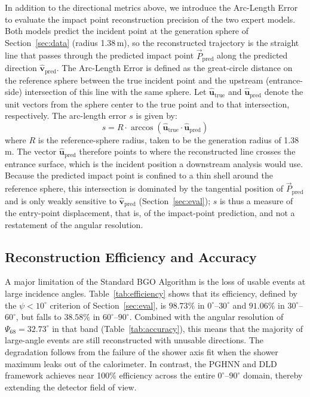 \documentclass[preprint,12pt]{elsarticle}
\begin{document}
In addition to the directional metrics above, we introduce the Arc-Length Error to evaluate the impact point reconstruction precision of the two expert models. Both models predict the incident point at the generation sphere of Section~\ref{sec:data} (radius 1.38\,m), so the reconstructed trajectory is the straight line that passes through the predicted impact point $\vec{P}_{\text{pred}}$ along the predicted direction $\hat{\mathbf{v}}_{\text{pred}}$. The Arc-Length Error is defined as the great-circle distance on the reference sphere between the true incident point and the upstream (entrance-side) intersection of this line with the same sphere. Let $\hat{\mathbf{u}}_{\text{true}}$ and $\hat{\mathbf{u}}_{\text{pred}}$ denote the unit vectors from the sphere center to the true point and to that intersection, respectively. The arc-length error $s$ is given by:
\begin{equation}
s = R \cdot \arccos(\hat{\mathbf{u}}_{\text{true}} \cdot \hat{\mathbf{u}}_{\text{pred}})
\end{equation}
where $R$ is the reference-sphere radius, taken to be the generation radius of 1.38\,m. The vector $\hat{\mathbf{u}}_{\text{pred}}$ therefore points to where the reconstructed line crosses the entrance surface, which is the incident position a downstream analysis would use. Because the predicted impact point is confined to a thin shell around the reference sphere, this intersection is dominated by the tangential position of $\vec{P}_{\text{pred}}$ and is only weakly sensitive to $\hat{\mathbf{v}}_{\text{pred}}$ (Section~\ref{sec:eval}); $s$ is thus a measure of the entry-point displacement, that is, of the impact-point prediction, and not a restatement of the angular resolution.

\subsection{Reconstruction Efficiency and Accuracy}
\label{ssec:efficiency}

A major limitation of the Standard BGO Algorithm is the loss of usable events at large incidence angles. Table~\ref{tab:efficiency} shows that its efficiency, defined by the $\psi<10^{\circ}$ criterion of Section~\ref{sec:eval}, is $98.73\%$ in $0^{\circ}$--$30^{\circ}$ and $91.06\%$ in $30^{\circ}$--$60^{\circ}$, but falls to $38.58\%$ in $60^{\circ}$--$90^{\circ}$. Combined with the angular resolution of $\Psi_{68}=32.73^{\circ}$ in that band (Table~\ref{tab:accuracy}), this means that the majority of large-angle events are still reconstructed with unusable directions. The degradation follows from the failure of the shower axis fit when the shower maximum leaks out of the calorimeter. In contrast, the PGHNN and DLD framework achieves near 100\% efficiency across the entire $0^{\circ}$--$90^{\circ}$ domain, thereby extending the detector field of view.
\end{document}
